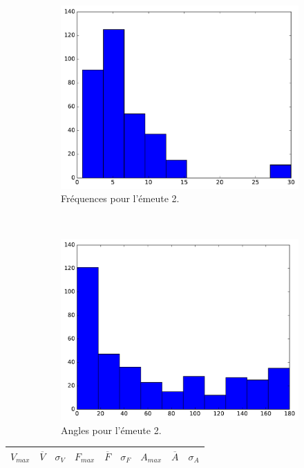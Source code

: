 \begin{appendices}
\begin{figure}[htbp]
\begin{subfigure}[t]{\subImgWclicks}
			\includegraphics[width=\textwidth]{figures/ch3/riot2a_frequency}
			\caption{Fréquences pour l'émeute 2.}
			\label{fig:riot2a_frequency}
		\end{subfigure}
		~
		\begin{subfigure}[t]{\subImgWclicks}
			\centering
			\includegraphics[width=\textwidth]{figures/ch3/riot2a_angle}
			\caption{Angles pour l'émeute 2.}
			\label{fig:riot2a_angle}
		\end{subfigure}
		\caption[Histogrammes, émeutes]{}
		\label{fig:histRiots}
	\end{figure}
	
	
	
	\begin{table}
		\centering
		\begin{tabular}{c c c c c c c c c}
			$V_{max}$	& $\overline{V}$	& $\sigma_{V}$	& $F_{max}$	& $\overline{F}$	& $\sigma_{F}$	& $A_{max}$	& $\overline{A}$	& $\sigma_{A}$	\bigstrut[b] \\ \hline
	

\end{tabular}
\end{table}
\end{appendices}
